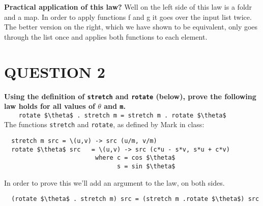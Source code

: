 \documentclass{article}
\begin{document}
\textbf{Practical application of this law?}
Well on the left side of this law is a foldr and a map. In order to apply
functions f and g it goes over the input list twice. The better version on
the right, which we have shown to be equivalent, only goes through the list
once and applies both functions to each element.

\pagebreak

\section*{QUESTION 2}
\textbf{Using the definition of \lstinline{stretch} and \lstinline{rotate}
(below), prove the following law holds for all values of $\theta$
and \lstinline{m}.}\\
\lstinline[mathescape]{    rotate $\theta$ . stretch m = stretch m . rotate $\theta$}\\

The functions \lstinline{stretch} and \lstinline{rotate}, as defined by Mark
in class:
\begin{lstlisting}
  stretch m src = \(u,v) -> src (u/m, v/m)
  rotate $\theta$ src   = \(u,v) -> src (c*u - s*v, s*u + c*v)
                         where c = cos $\theta$
                               s = sin $\theta$
\end{lstlisting}

In order to prove this we'll add an argument to the law, on both sides.
\begin{lstlisting}
  (rotate $\theta$ . stretch m) src = (stretch m .rotate $\theta$) src
\end{lstlisting}
\end{document}

